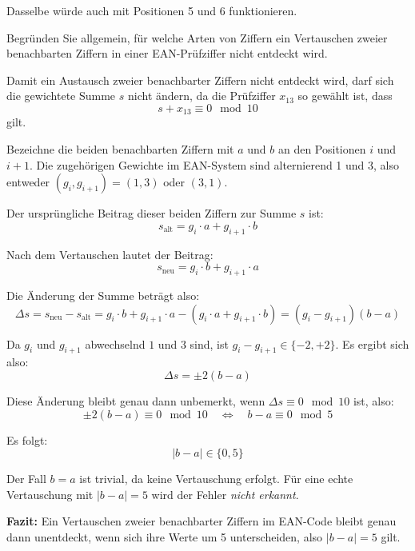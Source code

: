 \begin{myexercise}
\begin{myanswer}
Dasselbe würde auch mit Positionen 5 und 6 funktionieren.
\end{myanswer}

\begin{mychallenge}
Begründen Sie allgemein, für welche Arten von Ziffern ein Vertauschen zweier benachbarten Ziffern in einer EAN-Prüfziffer nicht entdeckt wird.
\begin{myanswer}
Damit ein Austausch zweier benachbarter Ziffern nicht entdeckt wird, darf sich die gewichtete Summe $s$ nicht ändern, da die Prüfziffer $x_{13}$ so gewählt ist, dass
\[
s + x_{13} \equiv 0 \mod 10
\]
gilt.

Bezeichne die beiden benachbarten Ziffern mit $a$ und $b$ an den Positionen $i$ und $i+1$. Die zugehörigen Gewichte im EAN-System sind alternierend 1 und 3, also entweder $(g_i, g_{i+1}) = (1, 3)$ oder $(3, 1)$.

Der ursprüngliche Beitrag dieser beiden Ziffern zur Summe $s$ ist:
\[
s_\text{alt} = g_i \cdot a + g_{i+1} \cdot b
\]

Nach dem Vertauschen lautet der Beitrag:
\[
s_\text{neu} = g_i \cdot b + g_{i+1} \cdot a
\]

Die Änderung der Summe beträgt also:
\[
\Delta s = s_\text{neu} - s_\text{alt} = g_i \cdot b + g_{i+1} \cdot a - (g_i \cdot a + g_{i+1} \cdot b)
= (g_i - g_{i+1})(b - a)
\]

Da $g_i$ und $g_{i+1}$ abwechselnd $1$ und $3$ sind, ist $g_i - g_{i+1} \in \{-2, +2\}$. Es ergibt sich also:
\[
\Delta s = \pm 2 (b - a)
\]

Diese Änderung bleibt genau dann unbemerkt, wenn $\Delta s \equiv 0 \mod 10$ ist, also:
\[
\pm 2(b - a) \equiv 0 \mod 10 \quad \Leftrightarrow \quad b - a \equiv 0 \mod 5
\]

Es folgt:
\[
|b - a| \in \{0, 5\}
\]

Der Fall $b = a$ ist trivial, da keine Vertauschung erfolgt. Für eine echte Vertauschung mit $|b - a| = 5$ wird der Fehler \emph{nicht erkannt}.

\medskip

\textbf{Fazit:} Ein Vertauschen zweier benachbarter Ziffern im EAN-Code bleibt genau dann unentdeckt, wenn sich ihre Werte um 5 unterscheiden, also $|b - a| = 5$ gilt.

\end{myanswer}
\end{mychallenge}



\end{myexercise}

